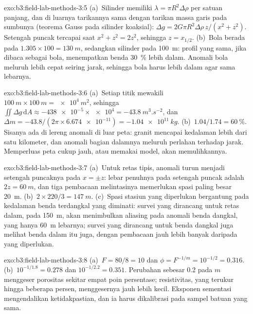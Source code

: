 \begin{solution}{exo:b3:field-lab-methods-3:5}
(a)~Silinder memiliki $\lambda = \pi R^2\Delta\rho$ per satuan panjang, dan
di luarnya tarikannya sama dengan tarikan massa garis pada sumbunya (teorema Gauss
pada silinder koaksial): $\Delta g = 2G\pi R^2\Delta\rho\,z/(x^2
+ z^2)$. Setengah puncak tercapai saat $x^2 + z^2 = 2z^2$, sehingga $z =
x_{1/2}$. (b)~Bola berada pada $1.305\times100 = \qty{130}{m}$, sedangkan
silinder pada \qty{100}{m}: profil yang sama, jika dibaca sebagai bola, menempatkan
benda \qty{30}{\percent} lebih dalam. Anomali bola meluruh lebih cepat seiring
jarak, sehingga bola harus lebih dalam agar sama lebarnya.
\end{solution}

\begin{solution}{exo:b3:field-lab-methods-3:6}
(a)~Setiap titik mewakili $\qty{100}{m}\times\qty{100}{m} =
\qty{e4}{m^2}$, sehingga $\iint\Delta g\,\mathrm{d}A \approx
\num{-438e-5}\times\num{e4} = \qty{-43.8}{m^3.s^{-2}}$, dan $\Delta m
= -43.8/(2\pi\times\num{6.674e-11}) = \qty{-1.04e11}{kg}$. (b)~$1.04/1.74
= \qty{60}{\percent}$. Sisanya ada di lereng anomali di luar
peta: granit mencapai kedalaman lebih dari satu kilometer, dan
anomali bagian dalamnya meluruh perlahan terhadap jarak. Memperluas peta
cukup jauh, atau memakai model, akan memulihkannya.
\end{solution}

\begin{solution}{exo:b3:field-lab-methods-3:7}
(a)~Untuk retas tipis, anomali turun menjadi setengah puncaknya pada $x = \pm z$:
lebar penuhnya pada setengah puncak adalah $2z = \qty{60}{m}$, dan tiga
pembacaan melintasinya memerlukan spasi paling besar \qty{20}{m}. (b)~$2\times
220/3 = \qty{147}{m}$. (c)~Spasi stasiun yang diperlukan bergantung pada
kedalaman benda terdangkal yang diminati: survei yang dirancang untuk retas
dalam, pada \qty{150}{m}, akan menimbulkan aliasing pada anomali benda dangkal, yang
hanya \qty{60}{m} lebarnya; survei yang dirancang untuk benda dangkal juga melihat
benda dalam itu juga, dengan pembacaan jauh lebih banyak daripada yang diperlukan.
\end{solution}

\begin{solution}{exo:b3:field-lab-methods-3:8}
(a)~$F = 80/8 = 10$ dan $\phi = F^{-1/m} = 10^{-1/2} = \num{0.316}$.
(b)~$10^{-1/1.8} = \num{0.278}$ dan $10^{-1/2.2} = \num{0.351}$. Perubahan
sebesar \num{0.2} pada $m$ menggeser porositas sekitar empat poin persentase;
resistivitas, yang terukur hingga beberapa persen, menggesernya jauh lebih kecil. Eksponen
sementasi mengendalikan ketidakpastian, dan ia harus dikalibrasi
pada sampel batuan yang sama.
\end{solution}

